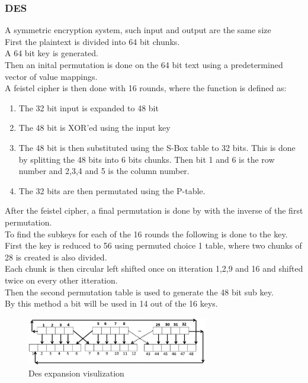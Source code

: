 \documentclass[12pt, a4paper]{article}
\begin{document}
			\subsubsection{DES}
				A symmetric encryption system, such input and output are the same size\\
				First the plaintext is divided into 64 bit chunks.\\
				A 64 bit key is generated.\\
				Then an inital permutation is done on the 64 bit text using a predetermined vector of value mappings.\\
				A feistel cipher is then done with 16 rounds, where the function is defined as:\\
				\begin{enumerate}
					\item The 32 bit input is expanded to 48 bit 
					\item The 48 bit is XOR'ed using the input key 
					\item The 48 bit is then substituted using the S-Box table to 32 bits. This is done by splitting the 48 bits into 6 bits chunks. Then bit 1 and 6 is the row number and 2,3,4 and 5 is the column number.
					\item The 32 bits are then permutated using the P-table.
				\end{enumerate}
				After the feistel cipher, a final permutation is done by with the inverse of the first permutation.\\[4mm]
				To find the subkeys for each of the 16 rounds the following is done to the key.\\
				First the key is reduced to 56 using permuted choice 1 table, where two chunks of 28 is created is also divided.\\
				Each chunk is then circular left shifted once on itteration 1,2,9 and 16 and shifted twice on every other itteration.\\
				Then the second permutation table is used to generate the 48 bit sub key.\\
				By this method a bit will be used in 14 out of the 16 keys.
				\begin{figure}[h!]
					\includegraphics[width=300px]{assets/desExpansion.png}
					\centering
					\caption{Des expansion visulization}
				\end{figure}
\end{document}

